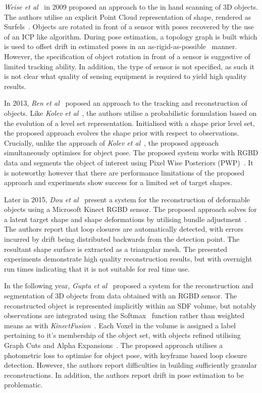 \textit{Weise et al}~\cite{Weise2009} in 2009 proposed an approach to the in hand scanning of 3D objects. 
The authors utilise an explicit Point Cloud representation of shape, rendered as Surfels~\cite{Pfister2000}. 
Objects are rotated in front of a sensor with poses recovered by the use of an ICP like algorithm. During 
pose estimation, a topology graph is built which is used to offset drift in estimated poses in an 
as-rigid-as-possible~\cite{Igarashi2005} manner. However, the specification of object rotation in front of 
a sensor is suggestive of limited tracking ability. In addition, the type of sensor is not specified, 
as such it is not clear what quality of sensing equipment is required to yield high quality results.

In 2013, \textit{Ren et al}~\cite{Ren2013} poposed an approach to the tracking and reconstruction of 
objects. Like \textit{Kolev et al}~\cite{Kolev2006}, the authors utilise a probabilistic formulation 
based on the evolution of a level set representation. Initialised with a shape prior level set, the 
proposed approach evolves the shape prior with respect to observations. Crucially, unlike the approach of 
\textit{Kolev et al}~\cite{Kolev2006}, the proposed approach simultaneously optimises for object pose.
The proposed system works with RGBD data and segments the object of interest using Pixel Wise Posteriors 
(PWP)~\cite{Bibby2008}. It is noteworthy however that there are performance limitations of the proposed 
approach and experiments show success for a limited set of target shapes.

Later in 2015, \textit{Dou et al}~\cite{Dou2015} present a system for the reconstruction of deformable 
objects using a Microsoft Kinect RGBD sensor. The proposed approach solves for a latent target shape 
and shape deformations by utilising bundle adjustment~\cite{Triggs1999}. The authors report that loop 
closures are automatically detected, with errors incurred by drift being distributed backwards from the 
detection point. The resultant shape surface is extracted as a triangular mesh. The presented experiments 
demonstrate high quality reconstruction results, but with overnight run times indicating that it is not 
suitable for real time use.

In the following year, \textit{Gupta et al}~\cite{Gupta2016} proposed a system for the reconstruction and 
segmentation of 3D objects from data obtained with an RGBD sensor. The reconstructed object is represented 
implicitly within an SDF volume, but notably observations are integrated using the Softmax~\cite{SOFTMAX} 
function rather than weighted means as with \textit{KinectFusion}~\cite{Newcombe2011}. Each Voxel in the 
volume is assigned a label pertaining to it's membership of the object set, with objects refined utilising 
Graph Cuts and Alpha Expansions~\cite{CLRS}. The proposed approach utilises a photometric loss to optimise 
for object pose, with keyframe based loop closure detection. However, the authors report difficulties in 
building sufficiently granular reconstructions. In addition, the authors report drift in pose estimation 
to be problematic.

